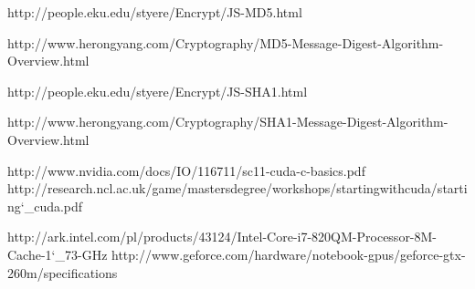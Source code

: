 \documentclass[12pt,a4paper,notitlepage]{report}
\begin{document}
	
	
	\begin{thebibliography}{1}
		
	   http://people.eku.edu/styere/Encrypt/JS-MD5.html

	    http://www.herongyang.com/Cryptography/MD5-Message-Digest-Algorithm-Overview.html

	   http://people.eku.edu/styere/Encrypt/JS-SHA1.html

	   http://www.herongyang.com/Cryptography/SHA1-Message-Digest-Algorithm-Overview.html


	 http://www.nvidia.com/docs/IO/116711/sc11-cuda-c-basics.pdf
	 http://research.ncl.ac.uk/game/mastersdegree/workshops/startingwithcuda/starting\char`_cuda.pdf
	
	 http://ark.intel.com/pl/products/43124/Intel-Core-i7-820QM-Processor-8M-Cache-1\char`_73-GHz
	 http://www.geforce.com/hardware/notebook-gpus/geforce-gtx-260m/specifications

	 \end{thebibliography}
\end{document}
